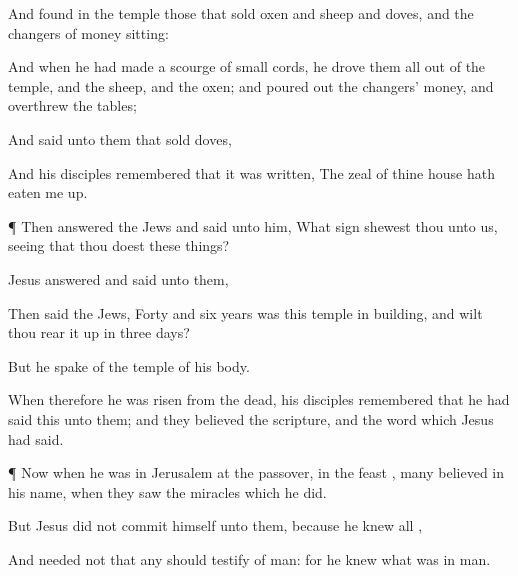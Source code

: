 {And
found
in the
temple those that
sold
oxen
and
sheep
and
doves,
and the changers of
money
sitting:

And when he had
made a
scourge
of small
cords, he
drove them
all
out of the
temple,
and the
sheep,
and the
oxen;
and poured
out the
changers’
money,
and
overthrew the
tables;

And
said unto them that
sold
doves,
{}

And
his
disciples
remembered
that it
was
written, The
zeal
of
thine
house hath
eaten
me
up.


\par }{\PP {}¶
Then
answered the
Jews
and
said unto
him,
What
sign shewest
thou unto
us, seeing
that thou
doest these
things?

Jesus
answered
and
said unto
them,
{}

Then
said the
Jews,
Forty
and
six
years
was
this
temple in
building,
and
wilt
thou
rear it
up
in
three
days?

But
he
spake
of the
temple
of
his
body.

When
therefore he was
risen
from the
dead,
his
disciples
remembered
that he had
said
this unto
them;
and they
believed the
scripture,
and the
word
which
Jesus had
said.


\par }{\PP {}¶
Now
when he
was
in
Jerusalem
at the
passover,
in the
feast
{},
many
believed
in
his
name, when they
saw the
miracles
which
he
did.

But
Jesus
did
not
commit
himself unto
them,
because
he
knew
all
{},

And
needed
not
that
any should
testify
of
man:
for
he
knew
what
was
in
man.




\par }
